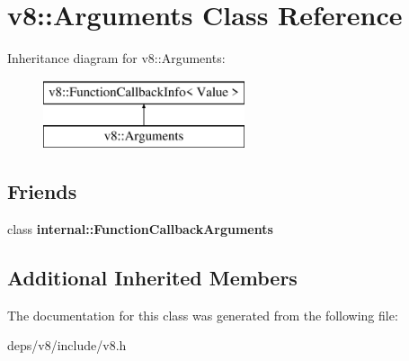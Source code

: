 \hypertarget{classv8_1_1_arguments}{}\section{v8\+:\+:Arguments Class Reference}
\label{classv8_1_1_arguments}
Inheritance diagram for v8\+:\+:Arguments\+:\begin{figure}[H]
\begin{center}
\leavevmode
\includegraphics[height=2.000000cm]{classv8_1_1_arguments}
\end{center}
\end{figure}
\subsection*{Friends}
\begin{DoxyCompactItemize}
\item 
\hypertarget{classv8_1_1_arguments_aac7268b20857fd75b69b86ded46d0f34}{}class {\bfseries internal\+::\+Function\+Callback\+Arguments}\label{classv8_1_1_arguments_aac7268b20857fd75b69b86ded46d0f34}

\end{DoxyCompactItemize}
\subsection*{Additional Inherited Members}


The documentation for this class was generated from the following file\+:\begin{DoxyCompactItemize}
\item 
deps/v8/include/v8.\+h\end{DoxyCompactItemize}
